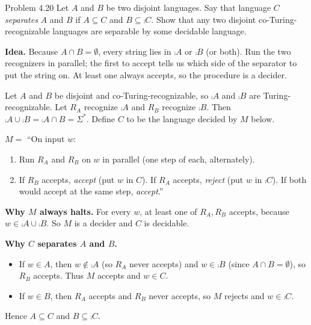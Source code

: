 \begin{question}{Problem 4.20}
Let $A$ and $B$ be two disjoint languages. Say that language $C$ \emph{separates} $A$ and $B$ if $A\subseteq C$ and $B\subseteq\comp{C}$. Show that any two disjoint co-Turing-recognizable languages are separable by some decidable language.
\end{question}
\begin{soln}
\textbf{Idea.} Because $A\cap B=\emptyset$, every string lies in $\comp{A}$ or $\comp{B}$ (or both). Run the two recognizers in parallel; the first to accept tells us which side of the separator to put the string on. At least one always accepts, so the procedure is a decider.

Let $A$ and $B$ be disjoint and co-Turing-recognizable, so $\comp{A}$ and $\comp{B}$ are Turing-recognizable. Let $R_A$ recognize $\comp{A}$ and $R_B$ recognize $\comp{B}$. Then $\comp{A}\cup\comp{B}=\comp{A\cap B}=\Sigma^*$. Define $C$ to be the language decided by $M$ below.

$M=$ ``On input $w$:
\begin{enumerate}
\item Run $R_A$ and $R_B$ on $w$ in parallel (one step of each, alternately).
\item If $R_B$ accepts, \emph{accept} (put $w$ in $C$). If $R_A$ accepts, \emph{reject} (put $w$ in $\comp{C}$). If both would accept at the same step, \emph{accept}.''
\end{enumerate}

\textbf{Why $M$ always halts.} For every $w$, at least one of $R_A,R_B$ accepts, because $w\in\comp{A}\cup\comp{B}$. So $M$ is a decider and $C$ is decidable.

\textbf{Why $C$ separates $A$ and $B$.}
\begin{itemize}
\item If $w\in A$, then $w\notin\comp{A}$ (so $R_A$ never accepts) and $w\in\comp{B}$ (since $A\cap B=\emptyset$), so $R_B$ accepts. Thus $M$ accepts and $w\in C$.
\item If $w\in B$, then $R_A$ accepts and $R_B$ never accepts, so $M$ rejects and $w\in\comp{C}$.
\end{itemize}
Hence $A\subseteq C$ and $B\subseteq\comp{C}$.
\end{soln}

